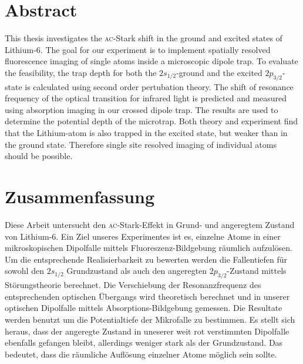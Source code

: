 \section*{Abstract}

This thesis investigates the \textsc{ac}-Stark shift in the ground and excited states of Lithium-6. 
The goal for our experiment is to implement spatially resolved fluorescence imaging of single atoms inside a microscopic dipole trap. To evaluate the feasibility, the trap depth for both the $2s_{1/2}$-ground and the excited $2p_{3/2}$-state is calculated using second order pertubation theory. The shift of resonance frequency of the optical transition for infrared light is predicted and measured using absorption imaging in our crossed dipole trap. The results are used to determine the potential depth of the microtrap. Both theory and experiment find that the Lithium-atom is also trapped in the excited state, but weaker than in the ground state. Therefore single site resolved imaging of individual atoms should be possible.

\section*{Zusammenfassung}

Diese Arbeit untersucht den \textsc{ac}-Stark-Effekt in Grund- und angeregtem Zustand von Lithium-6. Ein Ziel unseres Experimentes ist es, einzelne Atome in einer mikroskopischen Dipolfalle mittels Fluoreszenz-Bildgebung räumlich aufzulösen. Um die entsprechende Realisierbarkeit zu bewerten werden die Fallentiefen für sowohl den $2s_{1/2}$ Grundzustand als auch den angeregten $2p_{3/2}$-Zustand mittels Störungstheorie berechnet. Die Verschiebung der Resonanzfrequenz des entsprechenden optischen Übergangs wird theoretisch berechnet und in unserer optischen Dipolfalle mittels Absorptions-Bildgebung gemessen. Die Resultate werden benutzt um die Potentialtiefe der Mikrofalle zu bestimmen. Es stellt sich heraus, dass der angeregte Zustand in uneserer weit rot verstimmten Dipolfalle ebenfalls gefangen bleibt, allerdings weniger stark als der Grundzustand. Das bedeutet, dass die räumliche Auflösung einzelner Atome möglich sein sollte.